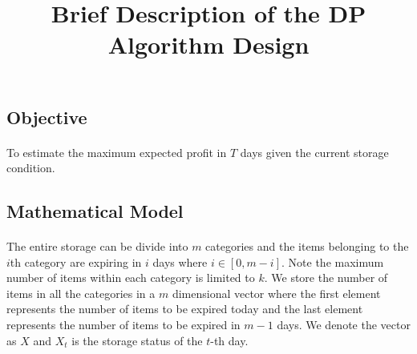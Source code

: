 \documentclass[11pt,reqno]{article}
\begin{document}
\title{\textbf {Brief Description of the DP Algorithm Design}}
\date{}
\maketitle
\subsection*{Objective} 
\paragraph{} To estimate the maximum expected profit in $T$ days given the current storage condition.
\subsection*{Mathematical Model}
\paragraph{} The entire storage can be divide into $m$ categories and the items belonging to the $i$th category are expiring in $i$ days where $i \in [0,m-i]$. Note the maximum number of items within each category is limited to $k$. We store the number of items in all the categories in a $m$ dimensional vector where the first element represents the number of items to be expired today and the last element represents the number of items to be expired in $m - 1$ days. We denote the vector as $X$ and $X_{t}$ is the storage status of the $t$-th day.
\end{document}
